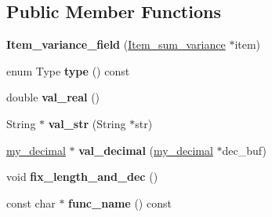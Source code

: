 \subsection*{Public Member Functions}
\begin{DoxyCompactItemize}
\item 
\mbox{\label{classItem__variance__field_a721ea825a558d3ffb621edca7058d2af}} 
{\bfseries Item\+\_\+variance\+\_\+field} (\mbox{\hyperlink{classItem__sum__variance}{Item\+\_\+sum\+\_\+variance}} $\ast$item)
\item 
\mbox{\label{classItem__variance__field_ad8a65eec4ad318da8811a886e30d357e}} 
enum Type {\bfseries type} () const
\item 
\mbox{\label{classItem__variance__field_a86a8701d3ff79d5dff236a37d6f76773}} 
double {\bfseries val\+\_\+real} ()
\item 
\mbox{\label{classItem__variance__field_a77f6935803ae67b251b95b22f100453e}} 
String $\ast$ {\bfseries val\+\_\+str} (String $\ast$str)
\item 
\mbox{\label{classItem__variance__field_a3556472727b695de7d79542f1c0cbaae}} 
\mbox{\hyperlink{classmy__decimal}{my\+\_\+decimal}} $\ast$ {\bfseries val\+\_\+decimal} (\mbox{\hyperlink{classmy__decimal}{my\+\_\+decimal}} $\ast$dec\+\_\+buf)
\item 
\mbox{\label{classItem__variance__field_ac8c49c2063e5bfaec836df830bb68aa3}} 
void {\bfseries fix\+\_\+length\+\_\+and\+\_\+dec} ()
\item 
\mbox{\label{classItem__variance__field_a23203c8a3cad02cf76785919c2ee4a25}} 
const char $\ast$ {\bfseries func\+\_\+name} () const
\end{DoxyCompactItemize}
